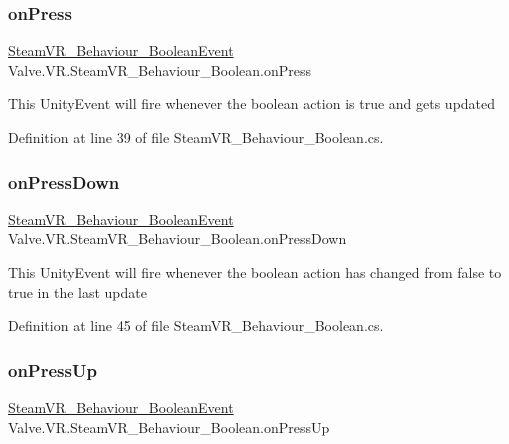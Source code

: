 \subsubsection{\texorpdfstring{onPress}{onPress}}
{\footnotesize\ttfamily \mbox{\hyperlink{class_valve_1_1_v_r_1_1_steam_v_r___behaviour___boolean_event}{Steam\+V\+R\+\_\+\+Behaviour\+\_\+\+Boolean\+Event}} Valve.\+V\+R.\+Steam\+V\+R\+\_\+\+Behaviour\+\_\+\+Boolean.\+on\+Press}



This Unity\+Event will fire whenever the boolean action is true and gets updated 



Definition at line 39 of file Steam\+V\+R\+\_\+\+Behaviour\+\_\+\+Boolean.\+cs.

\mbox{\label{class_valve_1_1_v_r_1_1_steam_v_r___behaviour___boolean_abb6167286813c1edd0b8d565aa6f1e36}} 
\subsubsection{\texorpdfstring{onPressDown}{onPressDown}}
{\footnotesize\ttfamily \mbox{\hyperlink{class_valve_1_1_v_r_1_1_steam_v_r___behaviour___boolean_event}{Steam\+V\+R\+\_\+\+Behaviour\+\_\+\+Boolean\+Event}} Valve.\+V\+R.\+Steam\+V\+R\+\_\+\+Behaviour\+\_\+\+Boolean.\+on\+Press\+Down}



This Unity\+Event will fire whenever the boolean action has changed from false to true in the last update 



Definition at line 45 of file Steam\+V\+R\+\_\+\+Behaviour\+\_\+\+Boolean.\+cs.

\mbox{\label{class_valve_1_1_v_r_1_1_steam_v_r___behaviour___boolean_ab81b2dae4a38e689a81af644da2c8ff4}} 
\subsubsection{\texorpdfstring{onPressUp}{onPressUp}}
{\footnotesize\ttfamily \mbox{\hyperlink{class_valve_1_1_v_r_1_1_steam_v_r___behaviour___boolean_event}{Steam\+V\+R\+\_\+\+Behaviour\+\_\+\+Boolean\+Event}} Valve.\+V\+R.\+Steam\+V\+R\+\_\+\+Behaviour\+\_\+\+Boolean.\+on\+Press\+Up}



